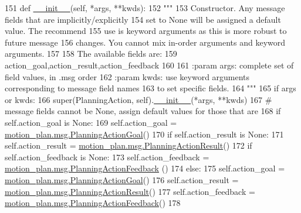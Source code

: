 \begin{DoxyCode}
151   \textcolor{keyword}{def }\hyperlink{classstate__machine_1_1Play_a5993a23d8be7f7b2647f71ede0334957}{\_\_init\_\_}(self, *args, **kwds):
152     \textcolor{stringliteral}{"""}
153 \textcolor{stringliteral}{    Constructor. Any message fields that are implicitly/explicitly}
154 \textcolor{stringliteral}{    set to None will be assigned a default value. The recommend}
155 \textcolor{stringliteral}{    use is keyword arguments as this is more robust to future message}
156 \textcolor{stringliteral}{    changes.  You cannot mix in-order arguments and keyword arguments.}
157 \textcolor{stringliteral}{}
158 \textcolor{stringliteral}{    The available fields are:}
159 \textcolor{stringliteral}{       action\_goal,action\_result,action\_feedback}
160 \textcolor{stringliteral}{}
161 \textcolor{stringliteral}{    :param args: complete set of field values, in .msg order}
162 \textcolor{stringliteral}{    :param kwds: use keyword arguments corresponding to message field names}
163 \textcolor{stringliteral}{    to set specific fields.}
164 \textcolor{stringliteral}{    """}
165     \textcolor{keywordflow}{if} args \textcolor{keywordflow}{or} kwds:
166       super(PlanningAction, self).\hyperlink{classstate__machine_1_1Play_a5993a23d8be7f7b2647f71ede0334957}{\_\_init\_\_}(*args, **kwds)
167       \textcolor{comment}{# message fields cannot be None, assign default values for those that are}
168       \textcolor{keywordflow}{if} self.action\_goal \textcolor{keywordflow}{is} \textcolor{keywordtype}{None}:
169         self.action\_goal = \hyperlink{classmotion__plan_1_1msg_1_1__PlanningActionGoal_1_1PlanningActionGoal}{motion\_plan.msg.PlanningActionGoal}()
170       \textcolor{keywordflow}{if} self.action\_result \textcolor{keywordflow}{is} \textcolor{keywordtype}{None}:
171         self.action\_result = \hyperlink{classmotion__plan_1_1msg_1_1__PlanningActionResult_1_1PlanningActionResult}{motion\_plan.msg.PlanningActionResult}()
172       \textcolor{keywordflow}{if} self.action\_feedback \textcolor{keywordflow}{is} \textcolor{keywordtype}{None}:
173         self.action\_feedback = \hyperlink{classmotion__plan_1_1msg_1_1__PlanningActionFeedback_1_1PlanningActionFeedback}{motion\_plan.msg.PlanningActionFeedback}
      ()
174     \textcolor{keywordflow}{else}:
175       self.action\_goal = \hyperlink{classmotion__plan_1_1msg_1_1__PlanningActionGoal_1_1PlanningActionGoal}{motion\_plan.msg.PlanningActionGoal}()
176       self.action\_result = \hyperlink{classmotion__plan_1_1msg_1_1__PlanningActionResult_1_1PlanningActionResult}{motion\_plan.msg.PlanningActionResult}()
177       self.action\_feedback = \hyperlink{classmotion__plan_1_1msg_1_1__PlanningActionFeedback_1_1PlanningActionFeedback}{motion\_plan.msg.PlanningActionFeedback}()
178 
\end{DoxyCode}


